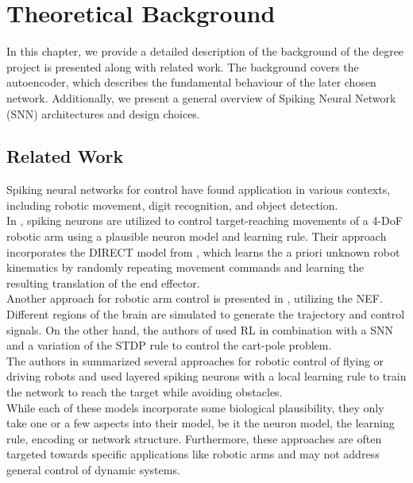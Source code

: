 \chapter{Theoretical Background}
In this chapter, we provide a detailed description of the background of the degree project is presented along with related work. The background covers the autoencoder, which describes the fundamental behaviour of the later chosen network. Additionally, we present a general overview of Spiking Neural Network (\ac{SNN}) architectures and design choices.

\section{Related Work}
Spiking neural networks for control have found application in various contexts, including robotic movement, digit recognition\cite{lee_training_2016}, and object detection\cite{soures_deep_2019,zhou_deep_2020}.\\
In \cite{bouganis_training_2010}, spiking neurons are utilized to control target-reaching movements of a 4-DoF robotic arm using a plausible neuron model and learning rule. Their approach incorporates the DIRECT model from \cite{bullock_self-organizing_1993}, which learns the a priori unknown robot kinematics by randomly repeating movement commands and learning the resulting translation of the end effector.\\
Another approach for robotic arm control is presented in \cite{dewolf_spiking_2016}, utilizing the \ac{NEF}\cite{eliasmith_neural_2004}. Different regions of the brain are simulated to generate the trajectory and control signals. On the other hand, the authors of \cite{liu_spiking_2023} used \ac{RL} in combination with a \ac{SNN} and a variation of the \ac{STDP} rule to control the cart-pole problem.\\
The authors in \cite{bing_supervised_2019} summarized several approaches for robotic control of flying or driving robots and used layered spiking neurons with a local learning rule to train the network to reach the target while avoiding obstacles.\\
While each of these models incorporate some biological plausibility, they only take one or a few aspects into their model, be it the neuron model, the learning rule, encoding or network structure. Furthermore, these approaches are often targeted towards specific applications like robotic arms and may not address general control of dynamic systems.\\
